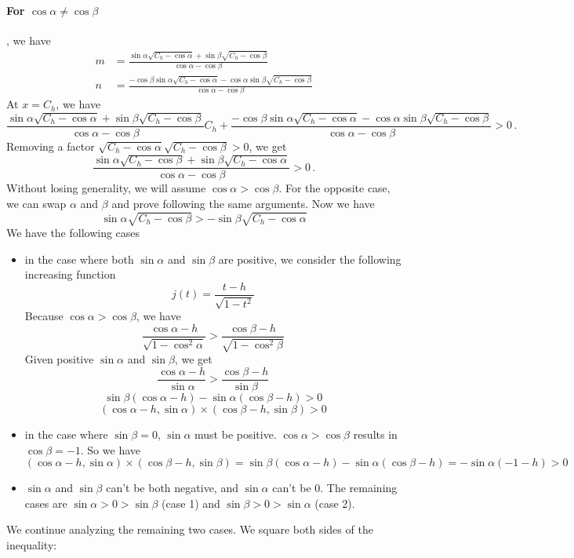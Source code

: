 \documentclass[]{article}
\begin{document}
\paragraph{For $\cos\alpha \neq \cos\beta$}, we have
\begin{align*}
m &= \frac{\sin\alpha\sqrt{C_h-\cos\alpha} + \sin\beta\sqrt{C_h-\cos\beta}}{\cos\alpha-\cos\beta}\\
n &= \frac{-\cos\beta\sin\alpha\sqrt{C_h-\cos\alpha} - \cos\alpha\sin\beta\sqrt{C_h-\cos\beta}}{\cos\alpha-\cos\beta}
\end{align*}
At $x = C_h$, we have
\[
\frac{\sin\alpha\sqrt{C_h-\cos\alpha} + \sin\beta\sqrt{C_h-\cos\beta}}{\cos\alpha-\cos\beta} C_h + \frac{-\cos\beta\sin\alpha\sqrt{C_h-\cos\alpha} - \cos\alpha\sin\beta\sqrt{C_h-\cos\beta}}{\cos\alpha-\cos\beta} > 0\,.
\]
Removing a factor $\sqrt{C_h-\cos\alpha}\sqrt{C_h-\cos\beta} > 0$, we get
\[
\frac{\sin\alpha\sqrt{C_h-\cos\beta} + \sin\beta\sqrt{C_h-\cos\alpha}}{\cos\alpha-\cos\beta} > 0\,.
\]
Without losing generality, we will assume $\cos\alpha > \cos\beta$. For the opposite case, we can swap $\alpha$ and $\beta$ and prove following the same arguments. Now we have
\[
\sin\alpha\sqrt{C_h-\cos\beta} > - \sin\beta\sqrt{C_h-\cos\alpha}
\]
We have the following cases
\begin{itemize}
	\item in the case where both $\sin\alpha$ and $\sin\beta$ are positive, we consider the following increasing function
	\[
	j(t) = \frac{t-h}{\sqrt{1-t^2}}
	\]
	Because $\cos\alpha > \cos\beta$, we have
	\[
	\frac{\cos\alpha-h}{\sqrt{1-\cos^2\alpha}} > \frac{\cos\beta-h}{\sqrt{1-\cos^2\beta}}
	\]
	Given positive $\sin\alpha$ and $\sin\beta$, we get
	\[
	\frac{\cos\alpha-h}{\sin\alpha} > \frac{\cos\beta-h}{\sin\beta}
	\]
	\[
	\sin\beta(\cos\alpha-h) -\sin\alpha(\cos\beta-h) > 0
	\]
	\[
	(\cos\alpha-h, \sin\alpha)\times(\cos\beta-h, \sin\beta) > 0
	\]
	\item in the case where $\sin\beta = 0$, $\sin\alpha$ must be positive. $\cos\alpha > \cos\beta$ results in $\cos\beta = -1$. So we have
	\[
	(\cos\alpha-h, \sin\alpha)\times(\cos\beta-h, \sin\beta) = \sin\beta(\cos\alpha-h) -\sin\alpha(\cos\beta-h) = -\sin\alpha(-1-h) > 0
	\]
	\item $\sin\alpha$ and $\sin\beta$ can't be both negative, and $\sin\alpha$ can't be 0. The remaining cases are $\sin\alpha > 0 > \sin\beta$ (case 1) and $\sin\beta > 0 > \sin\alpha$ (case 2).
\end{itemize}
We continue analyzing the remaining two cases. We square both sides of the inequality:
\end{document}
